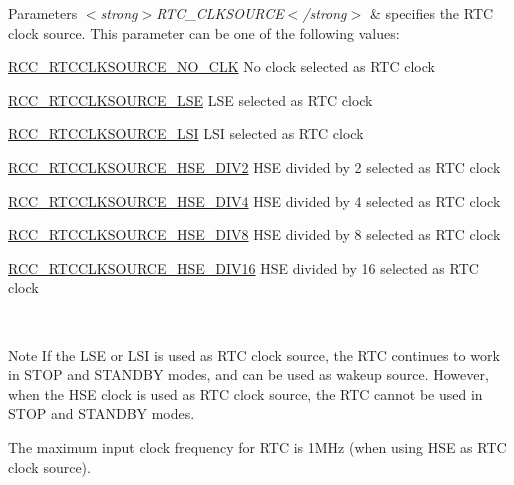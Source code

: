 \begin{DoxyParams}{Parameters}
{\em $<$strong$>$\-R\-T\-C\-\_\-\-C\-L\-K\-S\-O\-U\-R\-C\-E$<$/strong$>$} & specifies the R\-T\-C clock source. This parameter can be one of the following values\-: \begin{DoxyItemize}
\item \hyperlink{group___r_c_c___r_t_c___l_c_d___clock___source_gacce0b2f54d103340d8c3a218e86e295d}{R\-C\-C\-\_\-\-R\-T\-C\-C\-L\-K\-S\-O\-U\-R\-C\-E\-\_\-\-N\-O\-\_\-\-C\-L\-K} No clock selected as R\-T\-C clock \item \hyperlink{group___r_c_c___r_t_c___l_c_d___clock___source_ga5dca8d63f250a20bd6bc005670d0c150}{R\-C\-C\-\_\-\-R\-T\-C\-C\-L\-K\-S\-O\-U\-R\-C\-E\-\_\-\-L\-S\-E} L\-S\-E selected as R\-T\-C clock \item \hyperlink{group___r_c_c___r_t_c___l_c_d___clock___source_gab47a1afb8b5eef9f20f4772961d0a5f4}{R\-C\-C\-\_\-\-R\-T\-C\-C\-L\-K\-S\-O\-U\-R\-C\-E\-\_\-\-L\-S\-I} L\-S\-I selected as R\-T\-C clock \item \hyperlink{group___r_c_c___r_t_c___l_c_d___clock___source_gac1ee63256acb5637e994abf629edaf3b}{R\-C\-C\-\_\-\-R\-T\-C\-C\-L\-K\-S\-O\-U\-R\-C\-E\-\_\-\-H\-S\-E\-\_\-\-D\-I\-V2} H\-S\-E divided by 2 selected as R\-T\-C clock \item \hyperlink{group___r_c_c___r_t_c___l_c_d___clock___source_ga0f45ba0fe6a8f125137d3cee8b49f7cc}{R\-C\-C\-\_\-\-R\-T\-C\-C\-L\-K\-S\-O\-U\-R\-C\-E\-\_\-\-H\-S\-E\-\_\-\-D\-I\-V4} H\-S\-E divided by 4 selected as R\-T\-C clock \item \hyperlink{group___r_c_c___r_t_c___l_c_d___clock___source_gaf4f0209bbf068b427617f380e8e42490}{R\-C\-C\-\_\-\-R\-T\-C\-C\-L\-K\-S\-O\-U\-R\-C\-E\-\_\-\-H\-S\-E\-\_\-\-D\-I\-V8} H\-S\-E divided by 8 selected as R\-T\-C clock \item \hyperlink{group___r_c_c___r_t_c___l_c_d___clock___source_ga48e1ffd844b9e9192c5d7dbeed20765f}{R\-C\-C\-\_\-\-R\-T\-C\-C\-L\-K\-S\-O\-U\-R\-C\-E\-\_\-\-H\-S\-E\-\_\-\-D\-I\-V16} H\-S\-E divided by 16 selected as R\-T\-C clock \end{DoxyItemize}
\\
\hline
\end{DoxyParams}
\begin{DoxyNote}{Note}
If the L\-S\-E or L\-S\-I is used as R\-T\-C clock source, the R\-T\-C continues to work in S\-T\-O\-P and S\-T\-A\-N\-D\-B\-Y modes, and can be used as wakeup source. However, when the H\-S\-E clock is used as R\-T\-C clock source, the R\-T\-C cannot be used in S\-T\-O\-P and S\-T\-A\-N\-D\-B\-Y modes. 

The maximum input clock frequency for R\-T\-C is 1\-M\-Hz (when using H\-S\-E as R\-T\-C clock source). 
\end{DoxyNote}
